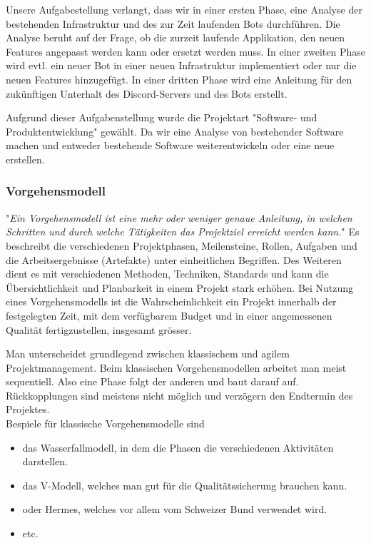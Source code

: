 \documentclass[a4paper, table]{article}
\begin{document}
Unsere Aufgabestellung verlangt, dass wir in einer ersten Phase, eine Analyse der bestehenden Infrastruktur und des zur Zeit laufenden Bots durchführen.
Die Analyse beruht auf der Frage, ob die zurzeit laufende Applikation, den neuen Features angepasst werden kann oder ersetzt werden muss.
In einer zweiten Phase wird evtl. ein neuer Bot in einer neuen Infrastruktur implementiert oder nur die neuen Features hinzugefügt.
In einer dritten Phase wird eine Anleitung für den zukünftigen Unterhalt des Discord-Servers und des Bots erstellt.

Aufgrund dieser Aufgabenstellung wurde die Projektart "Software- und Produktentwicklung" gewählt. Da wir eine Analyse von bestehender Software machen und
entweder bestehende Software weiterentwickeln oder eine neue erstellen.
\newpage
\subsubsection{Vorgehensmodell}\label{Vorgehensmodell}
"\textit{Ein Vorgehensmodell ist eine mehr oder weniger genaue Anleitung, in welchen Schritten und durch welche Tätigkeiten das Projektziel
erreicht werden kann.}"\autocite{sarre_lufthansa-reservierung_2009}
Es beschreibt die verschiedenen Projektphasen, Meilensteine, Rollen, Aufgaben und die Arbeitsergebnisse (Artefakte) unter einheitlichen Begriffen.
Des Weiteren dient es mit verschiedenen Methoden, Techniken, Standards und kann die Übersichtlichkeit und Planbarkeit in einem Projekt stark erhöhen.
Bei Nutzung eines Vorgehensmodells ist die Wahrscheinlichkeit ein Projekt innerhalb der festgelegten Zeit, mit dem verfügbarem Budget und in einer
angemessenen Qualität fertigzustellen, insgesamt grösser. \autocite{jenny_projektmanagement_2016} %
\newline

Man unterscheidet grundlegend zwischen klassischem und agilem Projektmanagement.
Beim klassischen Vorgehensmodellen arbeitet man meist sequentiell.
Also eine Phase folgt der anderen und baut darauf auf.
Rückkopplungen sind meistens nicht möglich und verzögern den Endtermin des Projektes.\\
Bespiele für klassische Vorgehensmodelle sind
\begin{itemize}
    \item das Wasserfallmodell, in dem die Phasen die verschiedenen Aktivitäten darstellen.
    \item das V-Modell, welches man gut für die Qualitätssicherung brauchen kann.
    \item oder Hermes, welches vor allem vom Schweizer Bund verwendet wird.
    \item etc.
\end{itemize}
\end{document}
